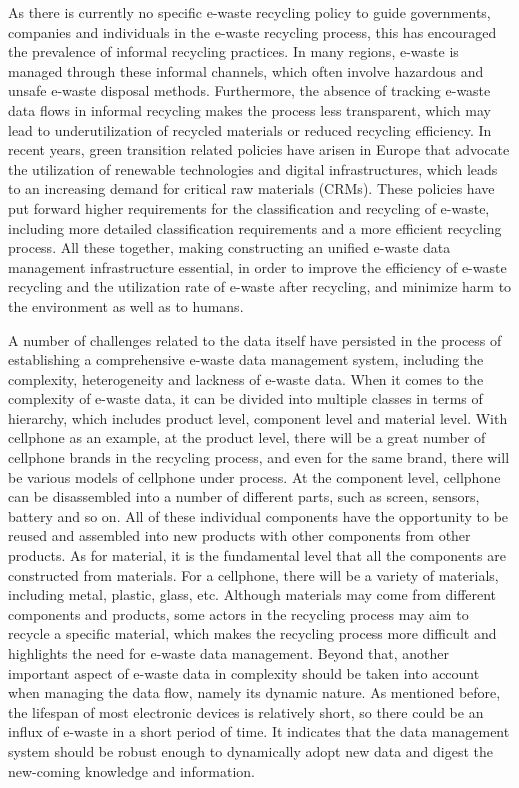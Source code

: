 \documentclass{article}
\numberwithin{equation}{section}
\begin{document}
As there is currently no specific e-waste recycling policy to guide governments, companies and individuals in the e-waste recycling process\cite{ramz08}, this has encouraged the prevalence of informal recycling practices. In many regions, e-waste is managed through these informal channels, which often involve hazardous and unsafe e-waste disposal methods. Furthermore, the absence of tracking e-waste data flows in informal recycling makes the process less transparent, which may lead to underutilization of recycled materials or reduced recycling efficiency. In recent years, green transition related policies have arisen in Europe that advocate the utilization of renewable technologies and digital infrastructures, which leads to an increasing demand for critical raw materials (CRMs). These policies have put forward higher requirements for the classification and recycling of e-waste, including more detailed classification requirements and a more efficient recycling process. All these together, making constructing an unified e-waste data management infrastructure essential,  in order to improve the efficiency of e-waste recycling and the utilization rate of e-waste after recycling, and minimize harm to the environment as well as to humans.

A number of challenges related to the data itself have persisted in the process of establishing a comprehensive e-waste data management system, including the complexity, heterogeneity and lackness of e-waste data. When it comes to the complexity of e-waste data\cite{ea22}, it can be divided into multiple classes  in terms of hierarchy, which includes product level, component level and material level. With cellphone as an example, at the product level, there will be a great number of cellphone brands in the recycling process, and even for the same brand, there will be various models of cellphone under process. At the component level, cellphone can be disassembled into a number of different parts, such as screen, sensors, battery and so on. All of these individual components have the opportunity to be reused and assembled into new products with other components from other products. As for material, it is the fundamental level that all the components are constructed from materials. For a cellphone, there will be a variety of materials, including metal, plastic, glass, etc. Although materials may come from different components and products, some actors in the recycling process may aim to recycle a specific material, which makes the recycling process more difficult and highlights the need for e-waste data management. Beyond that, another important aspect of e-waste data in complexity should be taken into account when managing the data flow, namely its dynamic nature. As mentioned before, the lifespan of most electronic devices is relatively short, so there could be an influx of e-waste in a short period of time. It indicates that the data management system should be robust enough to dynamically adopt new data and digest the new-coming knowledge and information.
\end{document}
